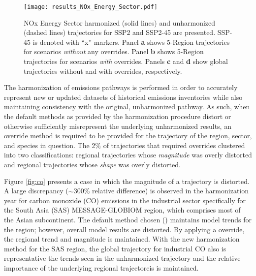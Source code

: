 \begin{figure}
  \begin{center}
    \texttt{[image: results\_NOx\_Energy\_Sector.pdf]}
    \caption[]{
      \label{fig:nox}
      NOx Energy Sector harmonized (solid lines) and unharmonized (dashed lines)
      trajectories for SSP2 and SSP2-45 are presented. SSP-45 is denoted with
      ``x'' markers. Panel \textbf{a} shows 5-Region trajectories for scenarios
      \textit{without} any overrides. Panel \textbf{b} shows 5-Region
      trajectories for scenarios \textit{with} overrides. Panels \textbf{c} and
      \textbf{d} show global trajectories without and with overrides,
      respectively.  }
  \end{center}
\end{figure}

The harmonization of emissions pathways is performed in order to accurately
represent new or updated datasets of historical emissions inventories while also
maintaining consistency with the original, unharmonized pathway. As such, when
the default methods as provided by the harmonization procedure distort or
otherwise sufficiently misrepresent the underlying unharmonized results, an
override method is required to be provided for the trajectory of the region,
sector, and species in question. The 2\% of trajectories that required overrides
clustered into two classifications: regional trajectories whose
\textit{magnitude} was overly distorted and regional trajectories whose
\textit{shape} was overly distorted.

Figure \ref{fig:co} presents a case in which the magnitude of a trajectory is
distorted. A large discrepancy ($\sim$300\% relative difference) is observed in
the harmonization year for carbon monoxide (CO) emissions in the industrial
sector specifically for the South Asia (SAS) MESSAGE-GLOBIOM region, which
comprises most of the Asian subcontinent. The default method chosen
() maintains model trends for the region; however, overall
model results are distorted. By applying a  override, the
regional trend and magnitude is maintained. With the new harmonization method
for the SAS region, the global trajectory for industrial CO also is
representative the trends seen in the unharmonized trajectory and the relative
importance of the underlying regional trajectoreis is maintained.
% 
% 


